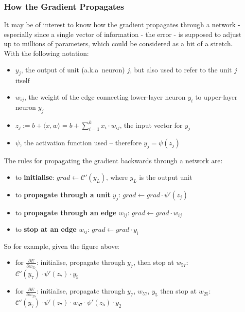 \documentclass[a4paper,11pt]{article}
\begin{document}
\subsubsection{How the Gradient Propagates}

It may be of interest to know how the gradient propagates through a network - especially since a single vector of information - the error - is supposed to adjust up to millions of parameters, which could be considered as a bit of a stretch.\\

With the following notation:
\begin{itemize}
\renewcommand\labelitemi{--}
\item $y_{j}$, the output of unit (a.k.a\ neuron) $j$, but also used to refer to the unit $j$ itself
\item $w_{ij}$, the weight of the edge connecting lower-layer neuron $y_{i}$ to upper-layer neuron $y_{j}$
\item $z_{j} := b+ \langle x,w \rangle = b + \sum\limits_{i=1}^k x_{i}\cdot w_{ij}$, the input vector for $y_{j}$
\item $\psi$, the activation function used -- therefore $y_{j} = \psi(z_{j})$ \\
\end{itemize}

The rules for propagating the gradient backwards through a network are:
\begin{itemize}
\renewcommand\labelitemi{--}
\item to \textbf{initialise}: $grad \leftarrow \mathcal{C}'(y_{L})$, where $y_{L}$ is the output unit
\item to \textbf{propagate through a unit} $y_{j}$: $grad \leftarrow grad \cdot \psi'(z_{j})$
\item to \textbf{propagate through an edge} $w_{ij}$: $grad \leftarrow grad \cdot w_{ij}$
\item to \textbf{stop at an edge} $w_{ij}$: $grad \leftarrow grad \cdot y_{i}$ \\
\end{itemize}



So for example, given the figure above:
\begin{itemize}
\renewcommand\labelitemi{--}
\item for $\frac{\partial{E}}{\partial{w_{57}}}$: initialise, propagate through $y_{7}$, then stop at $w_{57}$:
 $ \mathcal{C}'(y_{7}) \cdot \psi'(z_7) \cdot y_5$ 
\item for $\frac{\partial{E}}{\partial{w_{25}}}$: initialise, propagate through $y_{7}$, $w_{57}$, $y_{5}$ then stop at $w_{25}$:
 $\mathcal{C}'(y_{7}) \cdot \psi'(z_7) \cdot w_{57} \cdot \psi'(z_5) \cdot y_2$ \\
\end{itemize}
\end{document}
